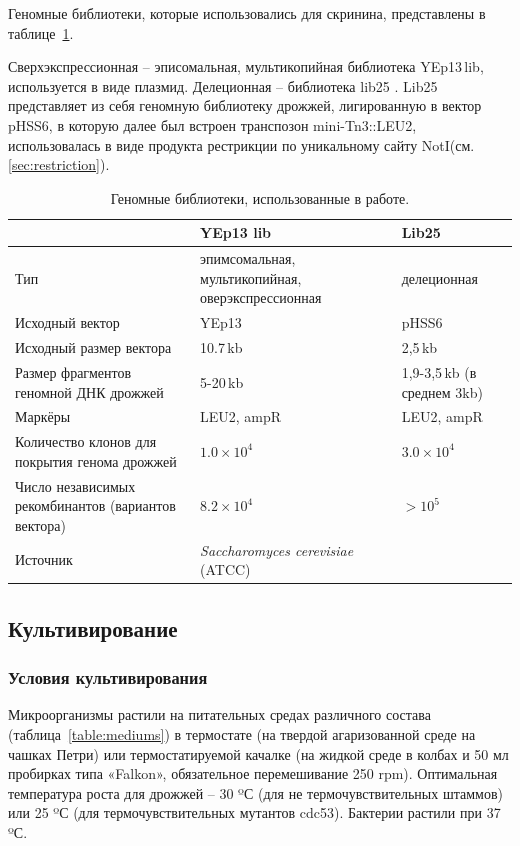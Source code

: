 Геномные библиотеки, которые использовались для скринина, представлены в таблице~\ref{table:libs}.

Сверхэкспрессионная --  эписомальная, мультикопийная библиотека YEp13\,lib, используется в виде плазмид.
Делеционная -- библиотека lib25 \cite{burns_large-scale_1994}. Lib25 представляет из себя геномную библиотеку дрожжей, лигированную в вектор pHSS6, в которую далее был встроен транспозон mini-Tn3::LEU2, использовалась в виде продукта рестрикции по уникальному сайту NotI(см. \ref{sec:restriction}).

\begin{table}[p]
	\small
	\caption{Геномные библиотеки, использованные в работе.}
	\label{table:libs}
	\begin{tabular}{p{0.4\width - \tabcolsep}p{0.3\width - 2\tabcolsep}p{0.3\width - \tabcolsep}}
	\graytable
	\toprule
	&YEp13 lib& Lib25 \\
	\midrule
	Тип & 
		эпимсомальная, мультикопийная, оверэкспрессионная & 
		делеционная \\ \thinrule
	Исходный вектор & YEp13 & pHSS6\\ \thinrule
	Исходный размер вектора & 10.7\,kb & 2,5\,kb\\ \thinrule
	Размер фрагментов геномной ДНК дрожжей & 5-20\,kb & 1,9-3,5\,kb (в среднем 3kb)\\ \thinrule
	Маркёры & LEU2, ampR & LEU2, ampR \\ \thinrule
	
	Количество клонов для покрытия генома дрожжей & $1.0\times10^4$ & $3.0\times10^4$ \\ \thinrule
	Число независимых рекомбинантов (вариантов вектора) & $8.2\times10^4$ & $>10^5$ \\ \thinrule
	Источник & 
		\footnotesize{ \textit{Saccharomyces cerevisiae} (ATCC\textregistered 37323\texttrademark)} &
		\cite{burns_large-scale_1994} \\
	\bottomrule
	\end{tabular}
\end{table}





\subsection{Культивирование}
\subsubsection{Условия культивирования}
Микроорганизмы растили на питательных средах различного состава (таблица~\ref{table:mediums}) в термостате (на твердой агаризованной среде на чашках Петри) или термостатируемой качалке (на жидкой среде в колбах и 50 мл пробирках типа «Falkon», обязательное перемешивание 250 rpm). Оптимальная температура роста для дрожжей --  30 ºС (для не термочувствительных штаммов) или  25 ºС (для термочувствительных мутантов cdc53). Бактерии растили при 37 ºС.


